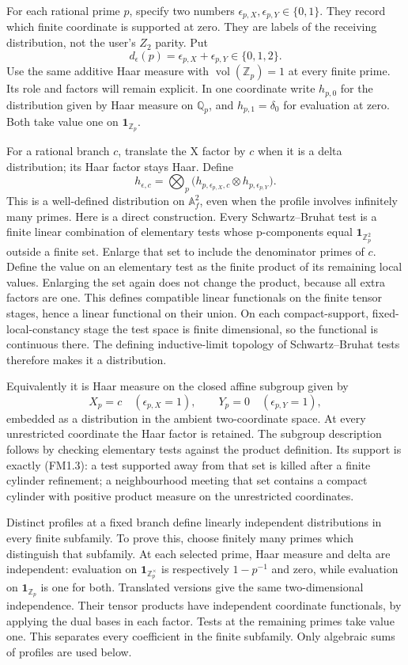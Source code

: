 For each rational prime \(p\), specify two numbers
\(\epsilon_{p,X},\epsilon_{p,Y}\in\{0,1\}\). They record which finite
coordinate is supported at zero. They are labels of the receiving
distribution, not the user's \(Z_2\) parity. Put \[
d_\epsilon(p)=\epsilon_{p,X}+\epsilon_{p,Y}\in\{0,1,2\}.
\tag{FM1.1}
\] Use the same additive Haar measure with
\(\operatorname{vol}(\mathbb Z_p)=1\) at every finite prime. Its role
and factors will remain explicit. In one coordinate write \(h_{p,0}\)
for the distribution given by Haar measure on \(\mathbb Q_p\), and
\(h_{p,1}=\delta_0\) for evaluation at zero. Both take value one on
\(\mathbf1_{\mathbb Z_p}\).

For a rational branch \(c\), translate the X factor by \(c\) when it is
a delta distribution; its Haar factor stays Haar. Define \[
h_{\epsilon,c}=\bigotimes_p
  \bigl(h_{p,\epsilon_{p,X},c}\otimes h_{p,\epsilon_{p,Y}}\bigr).
\tag{FM1.2}
\] This is a well-defined distribution on \(\mathbb A_f^2\), even when
the profile involves infinitely many primes. Here is a direct
construction. Every Schwartz--Bruhat test is a finite linear combination
of elementary tests whose p-components equal
\(\mathbf1_{\mathbb Z_p^2}\) outside a finite set. Enlarge that set to
include the denominator primes of \(c\). Define the value on an
elementary test as the finite product of its remaining local values.
Enlarging the set again does not change the product, because all extra
factors are one. This defines compatible linear functionals on the
finite tensor stages, hence a linear functional on their union. On each
compact-support, fixed-local-constancy stage the test space is finite
dimensional, so the functional is continuous there. The defining
inductive-limit topology of Schwartz--Bruhat tests therefore makes it a
distribution.

Equivalently it is Haar measure on the closed affine subgroup given by
\[
X_p=c\quad(\epsilon_{p,X}=1),\qquad
Y_p=0\quad(\epsilon_{p,Y}=1),
\tag{FM1.3}
\] embedded as a distribution in the ambient two-coordinate space. At
every unrestricted coordinate the Haar factor is retained. The subgroup
description follows by checking elementary tests against the product
definition. Its support is exactly (FM1.3): a test supported away from
that set is killed after a finite cylinder refinement; a neighbourhood
meeting that set contains a compact cylinder with positive product
measure on the unrestricted coordinates.

Distinct profiles at a fixed branch define linearly independent
distributions in every finite subfamily. To prove this, choose finitely
many primes which distinguish that subfamily. At each selected prime,
Haar measure and delta are independent: evaluation on
\(\mathbf1_{\mathbb Z_p^\times}\) is respectively \(1-p^{-1}\) and zero,
while evaluation on \(\mathbf1_{\mathbb Z_p}\) is one for both.
Translated versions give the same two-dimensional independence. Their
tensor products have independent coordinate functionals, by applying the
dual bases in each factor. Tests at the remaining primes take value one.
This separates every coefficient in the finite subfamily. Only algebraic
sums of profiles are used below.

